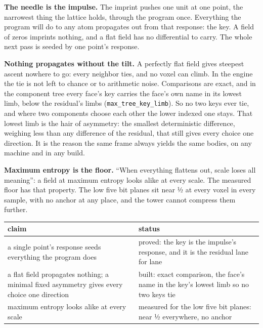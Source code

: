 \textbf{The needle is the impulse.} The imprint pushes one unit at one point, the narrowest thing the lattice holds, through the program once. Everything the program will do to any atom propagates out from that response: the key. A field of zeros imprints nothing, and a flat field has no differential to carry. The whole next pass is seeded by one point's response.

\textbf{Nothing propagates without the tilt.} A perfectly flat field gives steepest ascent nowhere to go: every neighbor ties, and no voxel can climb. In the engine the tie is not left to chance or to arithmetic noise. Comparisons are exact, and in the component tree every face's key carries the face's own name in its lowest limb, below the residual's limbs (\texttt{max\_\allowbreak{}tree\_\allowbreak{}key\_\allowbreak{}limb}). So no two keys ever tie, and where two components choose each other the lower indexed one stays. That lowest limb is the hair of asymmetry: the smallest deterministic difference, weighing less than any difference of the residual, that still gives every choice one direction. It is the reason the same frame always yields the same bodies, on any machine and in any build.

\textbf{Maximum entropy is the floor.} “When everything flattens out, scale loses all meaning”: a field at maximum entropy looks alike at every scale. The measured floor has that property. The low five bit planes sit near ½ at every voxel in every sample, with no anchor at any place, and the tower cannot compress them further.

{\small
\setlength{\tabcolsep}{6pt}
\begin{longtable}{>{\RaggedRight\arraybackslash}p{}>{\RaggedRight\arraybackslash}p{}}
\toprule
claim & status \\
\midrule
\endhead
a single point's response seeds everything the program does & proved: the key is the impulse's response, and it is the residual lane for lane \\
a flat field propagates nothing; a minimal fixed asymmetry gives every choice one direction & built: exact comparison, the face's name in the key's lowest limb so no two keys tie \\
maximum entropy looks alike at every scale & measured for the low five bit planes: near ½ everywhere, no anchor \\
\bottomrule
\end{longtable}
}

